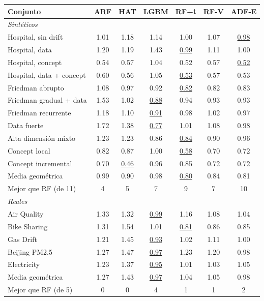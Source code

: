 \begin{tabularx}{\textwidth}{X *{6}{c}}
\toprule
Conjunto & ARF & HAT & LGBM & RF+t & RF-V & ADF-E \\
\midrule
\multicolumn{7}{l}{\textit{Sintéticos}} \\
Hospital, sin drift & 1.01 & 1.18 & 1.14 & 1.00 & 1.07 & \underline{0.98} \\
Hospital, data & 1.20 & 1.19 & 1.43 & \underline{0.99} & 1.11 & 1.00 \\
Hospital, concept & 0.54 & 0.57 & 1.04 & 0.52 & 0.57 & \underline{0.52} \\
Hospital, data + concept & 0.60 & 0.56 & 1.05 & \underline{0.53} & 0.57 & 0.53 \\
Friedman abrupto & 1.08 & 0.97 & 0.92 & \underline{0.82} & 0.82 & 0.83 \\
Friedman gradual + data & 1.53 & 1.02 & \underline{0.88} & 0.94 & 0.93 & 0.93 \\
Friedman recurrente & 1.18 & 1.10 & \underline{0.91} & 0.98 & 1.02 & 0.97 \\
Data fuerte & 1.72 & 1.38 & \underline{0.77} & 1.01 & 1.08 & 0.98 \\
Alta dimensión mixto & 1.23 & 1.23 & 0.86 & \underline{0.84} & 0.90 & 0.96 \\
Concept local & 0.82 & 0.87 & 1.00 & \underline{0.58} & 0.70 & 0.72 \\
Concept incremental & 0.70 & \underline{0.46} & 0.96 & 0.85 & 0.72 & 0.72 \\
\midrule Media geométrica & 0.99 & 0.90 & 0.98 & \underline{0.80} & 0.84 & 0.81 \\
Mejor que RF (de 11) & 4 & 5 & 7 & 9 & 7 & 10 \\
\midrule
\multicolumn{7}{l}{\textit{Reales}} \\
Air Quality & 1.33 & 1.32 & \underline{0.99} & 1.16 & 1.08 & 1.04 \\
Bike Sharing & 1.31 & 1.54 & 1.01 & \underline{0.81} & 0.86 & 0.85 \\
Gas Drift & 1.21 & 1.45 & \underline{0.93} & 1.02 & 1.11 & 1.00 \\
Beijing PM2.5 & 1.27 & 1.47 & \underline{0.97} & 1.23 & 1.20 & 0.98 \\
Electricity & 1.23 & 1.37 & \underline{0.95} & 1.01 & 1.03 & 1.05 \\
\midrule Media geométrica & 1.27 & 1.43 & \underline{0.97} & 1.04 & 1.05 & 0.98 \\
Mejor que RF (de 5) & 0 & 0 & 4 & 1 & 1 & 2 \\
\bottomrule
\end{tabularx}
